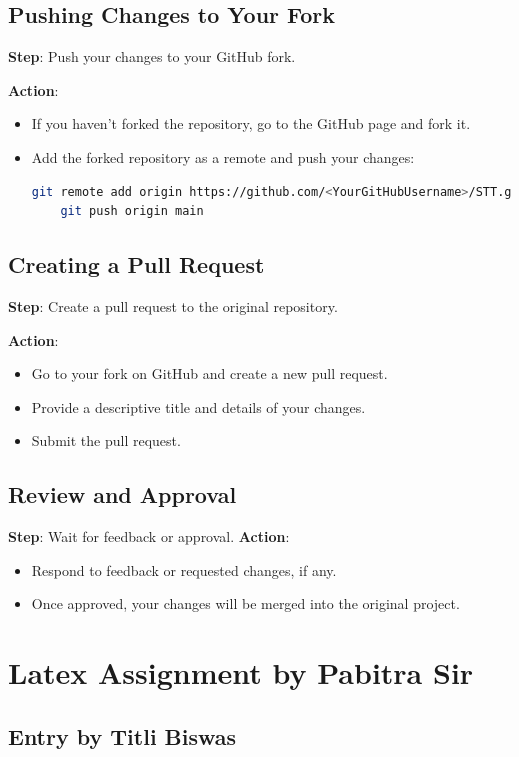 \documentclass{article}
\begin{document}
\subsection{Pushing Changes to Your Fork}
\textbf{Step}: Push your changes to your GitHub fork.

\textbf{Action}:
\begin{itemize}
    \item If you haven’t forked the repository, go to the GitHub page and fork it.
    \item Add the forked repository as a remote and push your changes:
    \begin{lstlisting}[language=bash]
    git remote add origin https://github.com/<YourGitHubUsername>/STT.git
    git push origin main
    \end{lstlisting}
\end{itemize}

\subsection{Creating a Pull Request}
\textbf{Step}: Create a pull request to the original repository.

\textbf{Action}:
\begin{itemize}
    \item Go to your fork on GitHub and create a new pull request.
    \item Provide a descriptive title and details of your changes.
    \item Submit the pull request.
\end{itemize}

\subsection{Review and Approval}
\textbf{Step}: Wait for feedback or approval.
\textbf{Action}:
\begin{itemize}
    \item Respond to feedback or requested changes, if any.
    \item Once approved, your changes will be merged into the original project.
\end{itemize}
\vspace{20in}
\section*{Latex Assignment by Pabitra Sir}

\subsection*{Entry by Titli Biswas}
\end{document}
